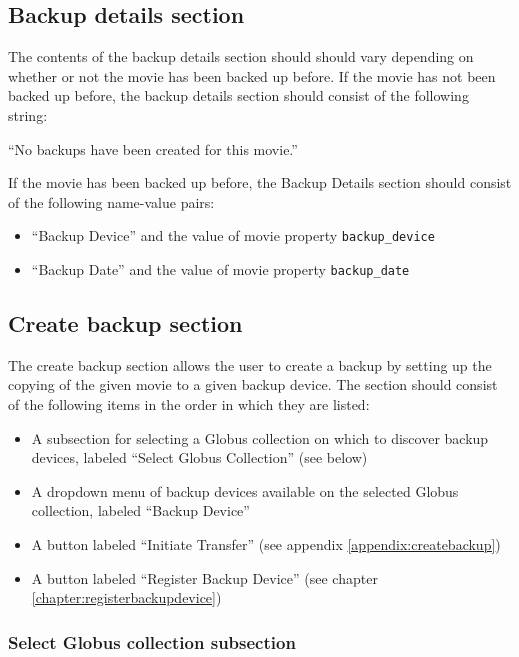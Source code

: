 \subsection{Backup details section}

The contents of the backup details section should should vary depending on 
whether or not the movie has been backed up before. If the movie has not been 
backed up before, the backup details section should consist of the following
string: 

\vspace{3mm}
``No backups have been created for this movie.''
\vspace{3mm}

\noindent If the movie has been backed up before, the Backup Details section
should consist of the following name-value pairs:

\begin{itemize}\itemsep1pt
  \item ``Backup Device'' and the value of movie property \texttt{backup\_device}
  \item ``Backup Date'' and the value of movie property \texttt{backup\_date}
\end{itemize}

\subsection{Create backup section}

The create backup section allows the user to create a backup by setting up the
copying of the given movie to a given backup device. The section should consist 
of the following items in the order in which they are listed:

\begin{itemize}\itemsep1pt
  \item A subsection for selecting a Globus collection on which to discover backup
  devices, labeled ``Select Globus Collection'' (see below)
  \item A dropdown menu of backup devices available on the selected Globus 
  collection, labeled ``Backup Device''
  \item A button labeled ``Initiate Transfer'' (see appendix 
  \ref{appendix:createbackup})
  \item A button labeled ``Register Backup Device'' (see chapter 
  \ref{chapter:registerbackupdevice})
\end{itemize}

\subsubsection{Select Globus collection subsection}

